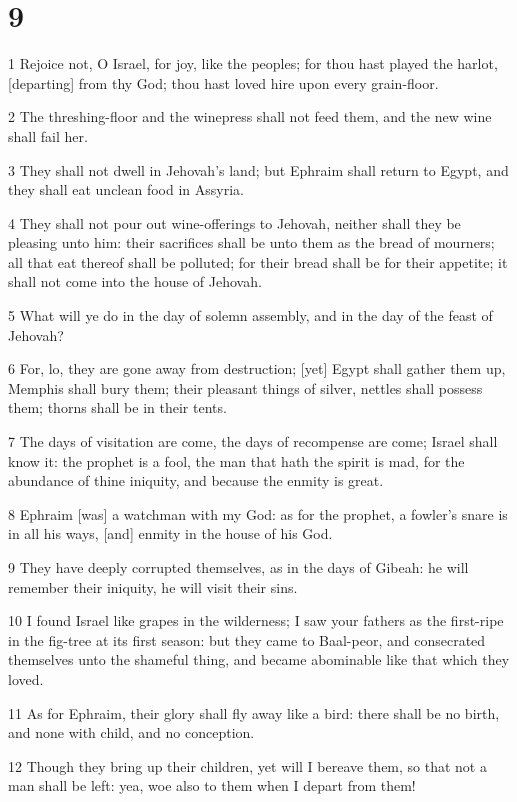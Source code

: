 \chapter{9}

\par 1 Rejoice not, O Israel, for joy, like the peoples; for thou hast played the harlot, [departing] from thy God; thou hast loved hire upon every grain-floor.
\par 2 The threshing-floor and the winepress shall not feed them, and the new wine shall fail her.
\par 3 They shall not dwell in Jehovah's land; but Ephraim shall return to Egypt, and they shall eat unclean food in Assyria.
\par 4 They shall not pour out wine-offerings to Jehovah, neither shall they be pleasing unto him: their sacrifices shall be unto them as the bread of mourners; all that eat thereof shall be polluted; for their bread shall be for their appetite; it shall not come into the house of Jehovah.
\par 5 What will ye do in the day of solemn assembly, and in the day of the feast of Jehovah?
\par 6 For, lo, they are gone away from destruction; [yet] Egypt shall gather them up, Memphis shall bury them; their pleasant things of silver, nettles shall possess them; thorns shall be in their tents.
\par 7 The days of visitation are come, the days of recompense are come; Israel shall know it: the prophet is a fool, the man that hath the spirit is mad, for the abundance of thine iniquity, and because the enmity is great.
\par 8 Ephraim [was] a watchman with my God: as for the prophet, a fowler's snare is in all his ways, [and] enmity in the house of his God.
\par 9 They have deeply corrupted themselves, as in the days of Gibeah: he will remember their iniquity, he will visit their sins.
\par 10 I found Israel like grapes in the wilderness; I saw your fathers as the first-ripe in the fig-tree at its first season: but they came to Baal-peor, and consecrated themselves unto the shameful thing, and became abominable like that which they loved.
\par 11 As for Ephraim, their glory shall fly away like a bird: there shall be no birth, and none with child, and no conception.
\par 12 Though they bring up their children, yet will I bereave them, so that not a man shall be left: yea, woe also to them when I depart from them!
